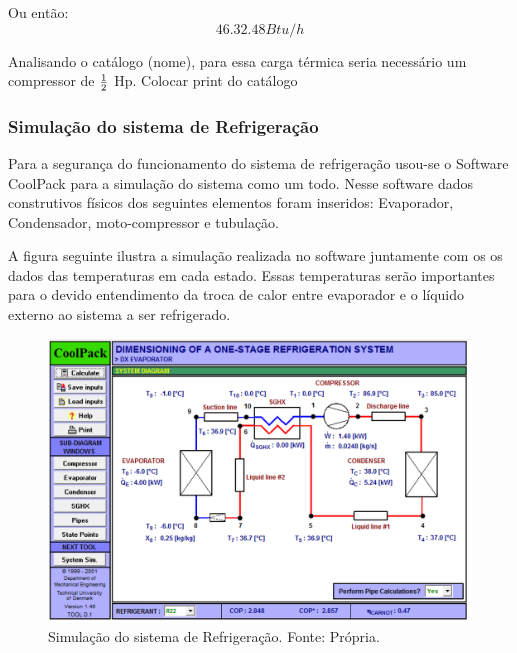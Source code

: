             Ou então:
            \begin{equation}
                46.32.48 Btu/h
            \end{equation}

            Analisando o catálogo (nome), para essa carga térmica seria necessário um compressor de
            $1 \over 2$ Hp. Colocar print do catálogo

            \subsubsection[Simulação do sistema de Refrigeração]{Simulação do sistema de Refrigeração}
                Para a segurança do funcionamento do sistema de refrigeração usou-se o
                Software CoolPack para a simulação do sistema como um todo. Nesse
                software dados construtivos físicos dos seguintes elementos foram inseridos: 
                Evaporador, Condensador, moto-compressor e tubulação. 

                A figura seguinte ilustra a simulação realizada no software juntamente com os os
                dados das temperaturas em cada estado. Essas temperaturas serão importantes para o
                devido entendimento da troca de calor entre evaporador e o líquido externo ao
                sistema a ser refrigerado.

                \begin{figure}[!htb]
            		\centering
            		\includegraphics[scale= 0.3]{figuras/simulacao-refrigeracao.png}
            		\caption{Simulação do sistema de Refrigeração. Fonte: Própria.}
            		\label{simulacao-refrigeracao}
            	\end{figure}

